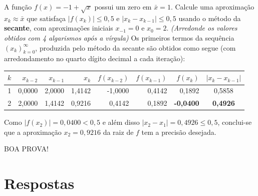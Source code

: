 \documentclass[12pt,a4paper]{article}
\begin{document}
\begin{ExerciseList}
\Exercise[title={2,0}] A função $f(x) = -1 + \sqrt{x}$ possui um zero em $\bar{x} = 1$. Calcule uma aproximação $x_k \approx \bar{x}$ que satisfaça $|f(x_k)| \leq 0,5$ e $|x_k - x_{k-1}| \leq 0,5$ usando o método da \textbf{secante}, com aproximações iniciais $x_{-1} = 0$ e $x_0 = 2$.
{\color{blue} \textit{(Arredonde os valores obtidos com 4 algarismos após a vírgula)}}
\Answer
Os primeiros termos da sequência $(x_k)_{k=0}^\infty$, produzida pelo método da secante são obtidos como segue (com arredondamento no quarto dígito decimal a cada iteração):
\medskip
\begin{center}
\begin{tabular}{rrrrrrrc}
\hline
$k$ & $x_{k-2}$ & $x_{k-1}$ & $x_k$ & $f(x_{k-2})$ & $f(x_{k-1})$ & $f(x_k)$ & $|x_k - x_{k-1}|$ \\
\hline
1 & 0,0000 & 2,0000 & 1,4142 & -1,0000 & 0,4142 & 0,1892 & 0,5858 \\
2 & 2,0000 & 1,4142 & 0,9216 & 0,4142 & 0,1892 & \textbf{-0,0400} & \textbf{0,4926} \\
\hline
\end{tabular}
\end{center}
\medskip
Como $|f(x_2)| = 0,0400 < 0,5$ e além disso $|x_2 - x_1| = 0,4926 \leq 0,5$, conclui-se que a aproximação $x_2 = 0,9216$ da raiz de $f$ tem a precisão desejada.
\end{ExerciseList}

\vfill
\begin{center}
BOA PROVA!
\end{center}

\newpage
\restoregeometry
\section*{Respostas}
\shipoutAnswer
\end{document}
